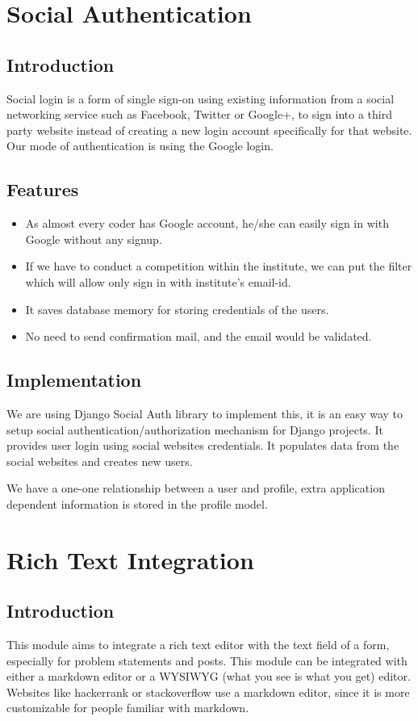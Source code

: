 \newpage

\section{Social Authentication}
\subsection{Introduction}
Social login is a form of single sign-on using existing information from a social networking service such as Facebook, Twitter or Google+, to sign into a third party website instead of creating a new login account specifically for that website.
Our mode of authentication is using the Google login.
\subsection{Features}
\begin{itemize}
	\item As almost every coder has Google account, he/she can easily sign in with Google without any signup.
	\item If we have to conduct a competition within the institute, we can put the filter which will allow only sign in with institute’s email-id.
	\item It saves database memory for storing credentials of the users.
	\item No need to send confirmation mail, and the email would be validated.

\end{itemize}
\subsection{Implementation}
We are using Django Social Auth library to implement this, it is an easy way to setup social authentication/authorization mechanism for Django projects. It provides user login using social websites credentials. It populates data from the social websites and creates new users.

We have a one-one relationship between a user and profile, extra application dependent information is stored in the profile model.


\section{Rich Text Integration}
\subsection{Introduction}
This module aims to integrate a rich text editor with the text field of a form, especially for problem statements and posts. This module can be integrated with either a markdown editor or a WYSIWYG (what you see is what you get) editor. Websites like hackerrank or stackoverflow use a markdown editor, since it is more customizable for people familiar with markdown.
